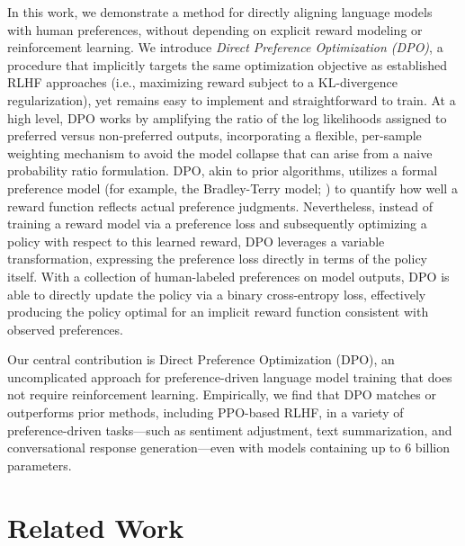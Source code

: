 In this work, we demonstrate a method for directly aligning language models with human preferences, without depending on explicit reward modeling or reinforcement learning. We introduce \textit{{Direct Preference Optimization} (DPO)}, a procedure that implicitly targets the same optimization objective as established RLHF approaches (i.e., maximizing reward subject to a KL-divergence regularization), yet remains easy to implement and straightforward to train. At a high level, DPO works by amplifying the ratio of the log likelihoods assigned to preferred versus non-preferred outputs, incorporating a flexible, per-sample weighting mechanism to avoid the model collapse that can arise from a naive probability ratio formulation. DPO, akin to prior algorithms, utilizes a formal preference model (for example, the Bradley-Terry model; \cite{bradley1952rankanalysis}) to quantify how well a reward function reflects actual preference judgments. Nevertheless, instead of training a reward model via a preference loss and subsequently optimizing a policy with respect to this learned reward, DPO leverages a variable transformation, expressing the preference loss directly in terms of the policy itself. With a collection of human-labeled preferences on model outputs, DPO is able to directly update the policy via a binary cross-entropy loss, effectively producing the policy optimal for an implicit reward function consistent with observed preferences.

Our central contribution is Direct Preference Optimization (DPO), an uncomplicated approach for preference-driven language model training that does not require reinforcement learning. Empirically, we find that DPO matches or outperforms prior methods, including PPO-based RLHF, in a variety of preference-driven tasks—such as sentiment adjustment, text summarization, and conversational response generation—even with models containing up to 6 billion parameters.

\section{Related Work}

